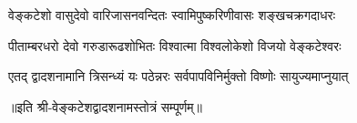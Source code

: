 

\twolineshloka
{वेङ्कटेशो वासुदेवो वारिजासनवन्दितः}
{स्वामिपुष्करिणीवासः शङ्खचक्रगदाधरः}

\twolineshloka
{पीताम्बरधरो देवो गरुडारूढशोभितः}
{विश्वात्मा विश्वलोकेशो विजयो वेङ्कटेश्वरः}

\twolineshloka
{एतद् द्वादशनामानि त्रिसन्ध्यं यः पठेन्नरः}
{सर्वपापविनिर्मुक्तो विष्णोः सायुज्यमाप्नुयात्}

॥इति श्री-वेङ्कटेशद्वादशनामस्तोत्रं सम्पूर्णम्॥


